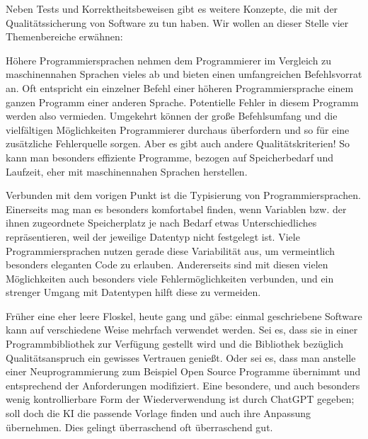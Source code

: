 \vspace{1mm} %

Neben Tests und Korrektheitsbeweisen gibt es weitere Konzepte, die mit der 
\linebreak %
Qualitäts\-sicherung von Software zu tun haben. Wir wollen an dieser Stelle vier Themenbereiche erwähnen:

\vspace{2mm} %


\vspace{0.5mm} %

Höhere Programmiersprachen nehmen dem Programmierer im Vergleich zu 
\linebreak %
maschinen\-nahen Sprachen vieles ab und bieten einen umfangreichen Befehlsvorrat an. Oft entspricht ein einzelner Befehl einer höheren Programmiersprache einem ganzen Programm einer anderen Sprache. Potentielle Fehler in diesem Programm werden also vermieden. Umgekehrt können der große Befehlsumfang und die vielfältigen Möglichkeiten Programmierer durchaus überfordern und so für eine zusätzliche Fehlerquelle sorgen. Aber es gibt auch andere Qualitätskriterien! So kann man besonders effiziente Programme, bezogen auf Speicherbedarf und Laufzeit, eher mit maschinennahen Sprachen herstellen.

\vspace{2mm} %


\vspace{0.5mm} %

Verbunden mit dem vorigen Punkt ist die Typisierung von Programmiersprachen. Einerseits mag man es besonders komfortabel finden, wenn Variablen bzw. der ihnen zugeordnete Speicherplatz je nach Bedarf etwas Unterschiedliches repräsentieren, weil der jeweilige Datentyp nicht festgelegt ist. Viele Programmiersprachen nutzen gerade diese Variabilität aus, um vermeintlich besonders eleganten Code zu erlauben. Andererseits sind mit diesen vielen Möglichkeiten auch besonders viele Fehlermöglichkeiten verbunden, und ein strenger Umgang mit Datentypen hilft diese zu vermeiden.
	

Früher eine eher leere Floskel, heute gang und gäbe: einmal geschriebene Soft\-ware kann auf verschiedene Weise mehrfach verwendet werden. Sei es, dass sie in einer Programmbibliothek zur Verfügung gestellt wird und die Bibliothek bezüglich Qualitätsanspruch ein gewisses Vertrauen genießt. Oder sei es, dass man anstelle einer Neuprogrammierung zum Beispiel Open Source Programme übernimmt und entsprechend der Anforderungen modifiziert. Eine besondere, und auch besonders wenig kontrollierbare Form der Wiederverwendung ist durch ChatGPT gegeben; soll doch die KI die passende Vorlage finden und auch ihre Anpassung übernehmen. Dies gelingt überraschend oft überraschend gut.
	
